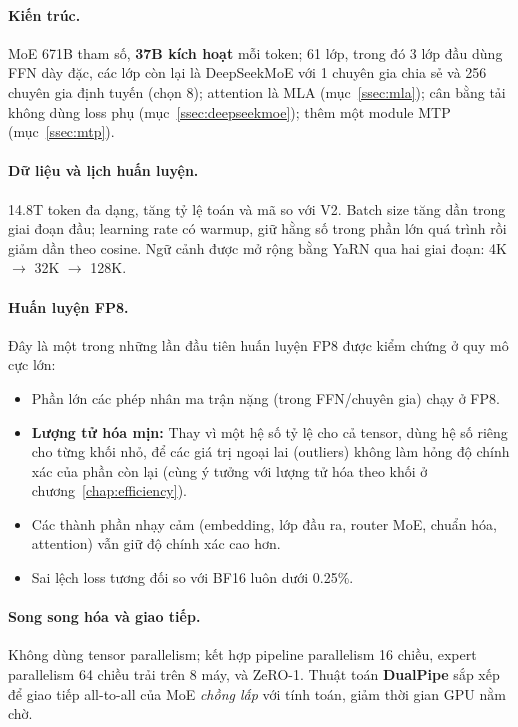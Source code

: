 \paragraph{Kiến trúc.} MoE 671B tham số, \textbf{37B kích hoạt} mỗi token; 61 lớp, trong đó 3 lớp đầu dùng FFN dày đặc, các lớp còn lại là DeepSeekMoE với 1 chuyên gia chia sẻ và 256 chuyên gia định tuyến (chọn 8); attention là MLA (mục~\ref{ssec:mla}); cân bằng tải không dùng loss phụ (mục~\ref{ssec:deepseekmoe}); thêm một module MTP (mục~\ref{ssec:mtp}).

\paragraph{Dữ liệu và lịch huấn luyện.} 14.8T token đa dạng, tăng tỷ lệ toán và mã so với V2. Batch size tăng dần trong giai đoạn đầu; learning rate có warmup, giữ hằng số trong phần lớn quá trình rồi giảm dần theo cosine. Ngữ cảnh được mở rộng bằng YaRN qua hai giai đoạn: 4K $\rightarrow$ 32K $\rightarrow$ 128K.

\paragraph{Huấn luyện FP8.} Đây là một trong những lần đầu tiên huấn luyện FP8 được kiểm chứng ở quy mô cực lớn:
\begin{itemize}
	\item Phần lớn các phép nhân ma trận nặng (trong FFN/chuyên gia) chạy ở FP8.
	\item \textbf{Lượng tử hóa mịn:} Thay vì một hệ số tỷ lệ cho cả tensor, dùng hệ số riêng cho từng khối nhỏ, để các giá trị ngoại lai (outliers) không làm hỏng độ chính xác của phần còn lại (cùng ý tưởng với lượng tử hóa theo khối ở chương~\ref{chap:efficiency}).
	\item Các thành phần nhạy cảm (embedding, lớp đầu ra, router MoE, chuẩn hóa, attention) vẫn giữ độ chính xác cao hơn.
	\item Sai lệch loss tương đối so với BF16 luôn dưới 0.25\%.
\end{itemize}

\paragraph{Song song hóa và giao tiếp.} Không dùng tensor parallelism; kết hợp pipeline parallelism 16 chiều, expert parallelism 64 chiều trải trên 8 máy, và ZeRO-1. Thuật toán \textbf{DualPipe} sắp xếp để giao tiếp all-to-all của MoE \emph{chồng lấp} với tính toán, giảm thời gian GPU nằm chờ.


